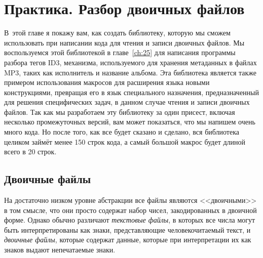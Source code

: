 \chapter{Практика. Разбор двоичных файлов}
\label{ch:24}

\thispagestyle{empty}

В~этой главе я покажу вам, как создать библиотеку, которую мы сможем использовать при
написании кода для чтения и записи двоичных файлов. Мы воспользуемся этой библиотекой в
главе~\ref{ch:25} для написания программы разбора тегов ID3, механизма, используемого для
хранения метаданных в файлах MP3, таких как исполнитель и название альбома. Эта библиотека
является также примером использования макросов для расширения языка новыми конструкциями,
превращая его в язык специального назначения, предназначенный для решения специфических
задач, в данном случае чтения и записи двоичных файлов. Так как мы разработаем эту
библиотеку за один присест, включая несколько промежуточных версий, вам может показаться,
что мы напишем очень много кода. Но после того, как все будет сказано и сделано, вся
библиотека целиком займёт менее 150 строк кода, а самый большой макрос будет длиной всего
в 20 строк.

\section{Двоичные файлы}

На достаточно низком уровне абстракции все файлы являются <<двоичными>> в том смысле, что
они просто содержат набор чисел, закодированных в двоичной форме.  Однако обычно
различают \textit{текстовые файлы}, в которых все числа могут быть интерпретированы как
знаки, представляющие человекочитаемый текст, и \textit{двоичные файлы}, которые содержат
данные, которые при интерпретации их как знаков выдают непечатаемые знаки.

